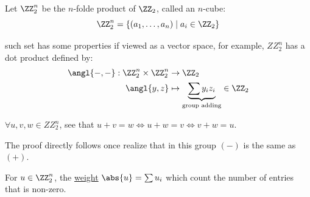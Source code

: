 Let \( \ZZ_2^n \) be the \( n \)-folde product of \( \ZZ_2 \), called an \( n \)-cube:
\[
	\ZZ_2^n = \{(a_1, \ldots, a_n) \; | \; a_i \in \ZZ_2\}
\]

such set has some properties if viewed as a vector space, for example, \( ZZ_2^n \) has a dot product defined by:
\[
	\begin{aligned}
		\angl{-,-}: \ZZ_2^n \times \ZZ_2^n & \to \ZZ_2                                                         \\
		\angl{y,z}                         & \mapsto \underbrace{\sum y_i z_i}_{\text{group adding}} \in \ZZ_2
	\end{aligned}
\]

\begin{lemma}
	\( \forall u,v,w\in ZZ_2^n \), see that \( u+v = w \iff u+w = v \iff v+w = u\).
\end{lemma}

The proof directly follows once realize that in this group \( (-) \) is the same as \( (+) \).

For \( u\in \ZZ_2^n \), the \underline{weight} \( \abs{u} = \sum u_i \) which count the number of entries that is non-zero.
